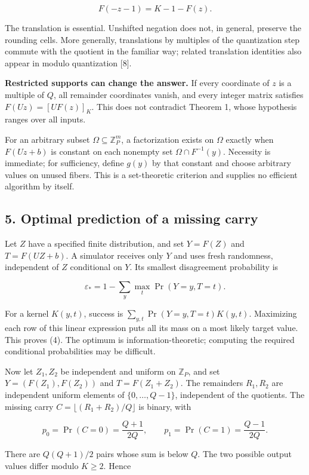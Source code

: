 \documentclass[
]{article}
\begin{document}
\[
F(-z-1)=K-1-F(z).
\tag{3}
\]

The translation is essential. Unshifted negation does not, in general,
preserve the rounding cells. More generally, translations by multiples
of the quantization step commute with the quotient in the familiar way;
related translation identities also appear in modulo quantization
{[}8{]}.

\textbf{Restricted supports can change the answer.} If every coordinate
of \(z\) is a multiple of \(Q\), all remainder coordinates vanish, and
every integer matrix satisfies \(F(Uz)=[UF(z)]_K\). This does not
contradict Theorem 1, whose hypothesis ranges over all inputs.

For an arbitrary subset \(\Omega\subseteq\mathbb Z_P^m\), a
factorization exists on \(\Omega\) exactly when \(F(Uz+b)\) is constant
on each nonempty set \(\Omega\cap F^{-1}(y)\). Necessity is immediate;
for sufficiency, define \(g(y)\) by that constant and choose arbitrary
values on unused fibers. This is a set-theoretic criterion and supplies
no efficient algorithm by itself.

\subsection{5. Optimal prediction of a missing
carry}\label{optimal-prediction-of-a-missing-carry}

Let \(Z\) have a specified finite distribution, and set \(Y=F(Z)\) and
\(T=F(UZ+b)\). A simulator receives only \(Y\) and uses fresh
randomness, independent of \(Z\) conditional on \(Y\). Its smallest
disagreement probability is

\[
\varepsilon_* =1-\sum_y\max_t\Pr(Y=y,T=t).
\tag{4}
\]

For a kernel \(K(y,t)\), success is \(\sum_{y,t}\Pr(Y=y,T=t)K(y,t)\).
Maximizing each row of this linear expression puts all its mass on a
most likely target value. This proves (4). The optimum is
information-theoretic; computing the required conditional probabilities
may be difficult.

Now let \(Z_1,Z_2\) be independent and uniform on \(\mathbb Z_P\), and
set \(Y=(F(Z_1),F(Z_2))\) and \(T=F(Z_1+Z_2)\). The remainders
\(R_1,R_2\) are independent uniform elements of \(\{0,\ldots,Q-1\}\),
independent of the quotients. The missing carry
\(C=\lfloor(R_1+R_2)/Q\rfloor\) is binary, with

\[
p_0=\Pr(C=0)=\frac{Q+1}{2Q},\qquad p_1=\Pr(C=1)=\frac{Q-1}{2Q}.
\tag{5}
\]

There are \(Q(Q+1)/2\) pairs whose sum is below \(Q\). The two possible
output values differ modulo \(K\ge2\). Hence
\end{document}
